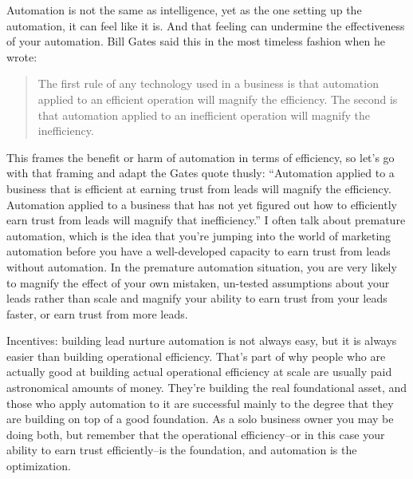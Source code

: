 Automation is not the same as intelligence, yet as the one setting up the automation, it can feel like it is. And that feeling can undermine the effectiveness of your automation. Bill Gates said this in the most timeless fashion when he wrote:

\begin{quote}
The first rule of any technology used in a business is that automation applied to an efficient operation will magnify the efficiency. The second is that automation applied to an inefficient operation will magnify the inefficiency.
\end{quote}

This frames the benefit or harm of automation in terms of efficiency, so let's go with that framing and adapt the Gates quote thusly: ``Automation applied to a business that is efficient at earning trust from leads will magnify the efficiency. Automation applied to a business that has not yet figured out how to efficiently earn trust from leads will magnify that inefficiency.'' I often talk about premature automation, which is the idea that you're jumping into the world of marketing automation before you have a well-developed capacity to earn trust from leads without automation. In the premature automation situation, you are very likely to magnify the effect of your own mistaken, un-tested assumptions about your leads rather than scale and magnify your ability to earn trust from your leads faster, or earn trust from more leads.

Incentives: building lead nurture automation is not always easy, but it is always easier than building operational efficiency. That's part of why people who are actually good at building actual operational efficiency at scale are usually paid astronomical amounts of money. They're building the real foundational asset, and those who apply automation to it are successful mainly to the degree that they are building on top of a good foundation. As a solo business owner you may be doing both, but remember that the operational efficiency--or in this case your ability to earn trust efficiently--is the foundation, and automation is the optimization.

